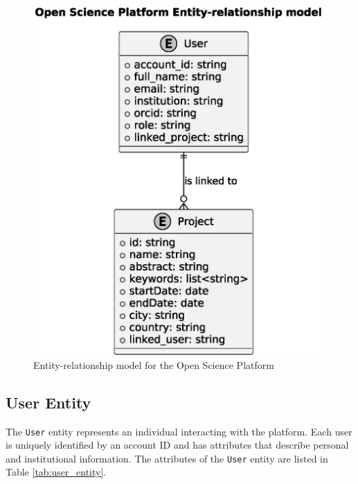 \documentclass[final]{rc-book-2.14}
\begin{document}
\begin{figure}[htbp]
    \centering
    \includegraphics[width=0.98\textwidth, keepaspectratio]{fig/entity_relationship_model.eps}
    \caption{Entity-relationship model for the Open Science Platform}
    \label{fig:er_model}
\end{figure}



\subsection{User Entity}
The \texttt{User} entity represents an individual interacting with the platform. Each user is uniquely identified by an account ID and has attributes that describe personal and institutional information. The attributes of the \texttt{User} entity are listed in Table \ref{tab:user_entity}.
\end{document}
